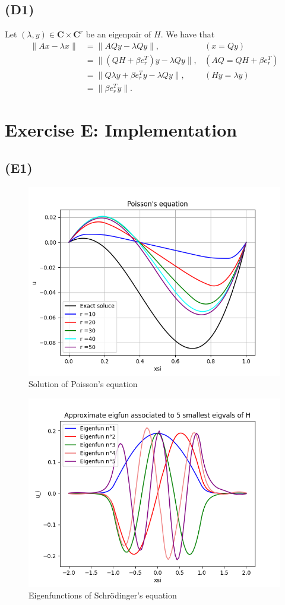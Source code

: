 \documentclass{article}
\begin{document}
\subsection*{(D1)}
Let $(\lambda, y) \in \mathbf{C} \times \mathbf{C}^r$ be an eigenpair of $H$. We have that
\begin{align*}
    \|Ax-\lambda x \| & = \|AQy-\lambda Qy \|, & (x=Qy)\\
    &=\|(QH+\beta e_r^T)y-\lambda Qy \|, &  (AQ = QH+\beta e_r^T) \\
    &=\|Q \lambda y+\beta e_r^Ty-\lambda Qy \|, & (Hy=\lambda y)\\
    &=\|\beta e_r^Ty \|. &
\end{align*}


\section{Exercise E: Implementation}
\subsection*{(E1)}
\begin{figure}[h]
\centering
\includegraphics[width=\textwidth]{figures/E1_latex.png}
\caption{Solution of Poisson's equation}
\label{fig:poisson}
\end{figure}

\begin{figure}[h]
\centering
\includegraphics[width=\textwidth]{figures/E2_latex.png}
\caption{Eigenfunctions of Schrödinger's equation}
\label{fig:Schrödinger}
\end{figure}
\end{document}
